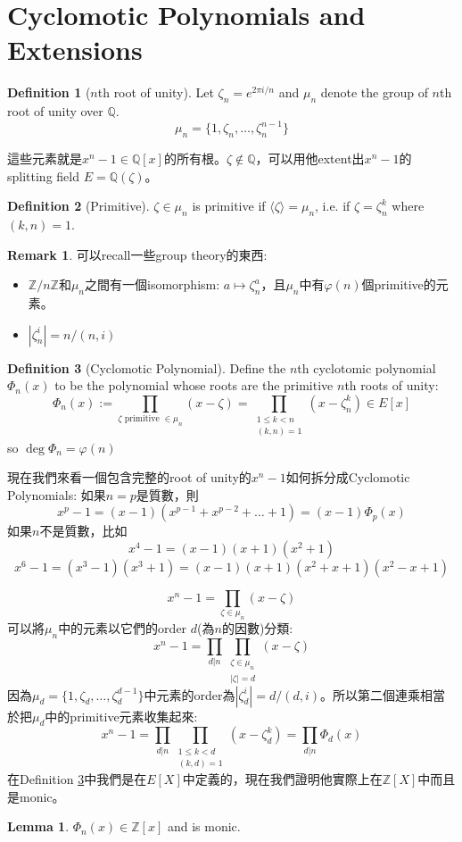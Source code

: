 \documentclass[12pt]{article}
\theoremstyle{definition}
\newtheorem{lem}{Lemma}
\newtheorem{dfn}{Definition}
\newtheorem{rem}{Remark}
\newcommand{\QQ}{\mathbb Q}
\newcommand{\ZZ}{\mathbb Z}
\begin{document}
\section{Cyclomotic Polynomials and Extensions}

\begin{dfn}[$n$th root of unity]
	Let $\zeta_n=e^{2\pi i/n}$ and $\mu_n$ denote the group of $n$th root of unity over $\QQ$.
	\[\mu_n=\{1,\zeta_n,\dots,\zeta_n^{n-1}\}\]
\end{dfn}
這些元素就是$x^n-1\in\QQ[x]$的所有根。$\zeta\notin\QQ$，可以用他extent出$x^n-1$的splitting field $E=\QQ(\zeta)$。

\begin{dfn}[Primitive]
	$\zeta\in \mu_n$ is primitive if $\langle\zeta\rangle=\mu_n$, i.e. if $\zeta=\zeta_n^k$ where $(k,n)=1$.
\end{dfn}

\begin{rem}
	可以recall一些group theory的東西:
	\begin{itemize}
		\item $\ZZ/n\ZZ$和$\mu_n$之間有一個isomorphism: $a\mapsto \zeta_n^a$，且$\mu_n$中有$\varphi(n)$個primitive的元素。
		\item $|\zeta_n^i|=n/(n,i)$
	\end{itemize}
\end{rem}

\begin{dfn}[Cyclomotic Polynomial]\label{cyclomotic_polynomial}
	Define the $n$th cyclotomic polynomial $\Phi_n(x)$ to be the polynomial whose roots are the primitive $n$th roots of unity:
	\[
		\Phi_n(x):=\prod_{\zeta\text{ primitive }\in \mu_n}(x-\zeta)=\prod_{\substack{ 1\le k < n \\ (k,n)=1}}(x-\zeta_n^k)\in E[x]
	\]
	so $\deg \Phi_n = \varphi(n)$
\end{dfn}

現在我們來看一個包含完整的root of unity的$x^n-1$如何拆分成Cyclomotic Polynomials:
如果$n=p$是質數，則
\[x^p-1=(x-1)(x^{p-1}+x^{p-2}+\dots+1)=(x-1)\Phi_p(x)\]
如果$n$不是質數，比如
\[x^4-1=(x-1)(x+1)(x^2+1)\]
\[x^6-1=(x^3-1)(x^3+1)=(x-1)(x+1)(x^2+x+1)(x^2-x+1)\]

\[
	x^n-1=\prod_{\zeta\in\mu_n}(x-\zeta)
\]
可以將$\mu_n$中的元素以它們的order $d$(為$n$的因數)分類:
\[
	x^n-1=\prod_{d|n}\prod_{\substack{\zeta\in\mu_n\\|\zeta|=d}}(x-\zeta)
\]
因為$\mu_d=\{1,\zeta_d,\dots,\zeta_{d}^{d-1}\}$中元素的order為$|\zeta_d^i|=d/(d,i)$。所以第二個連乘相當於把$\mu_d$中的primitive元素收集起來:
\[
	x^n-1=\prod_{d|n}\prod_{\substack{1\le k<d\\(k,d)=1}}(x-\zeta_d^k)=\prod_{d|n} \Phi_d(x)
\]
在Definition \ref{cyclomotic_polynomial}中我們是在$E[X]$中定義的，現在我們證明他實際上在$\ZZ[X]$中而且是monic。
\begin{lem}
	$\Phi_n(x) \in \mathbb{Z}[x]$ and is monic.
\end{lem}
\end{document}
